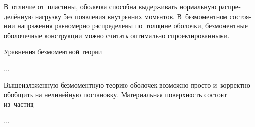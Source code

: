 

\begin{otherlanguage}{russian}

В~отличие от~пластины, оболочка способна выдерживать нормальную распределённую нагрузку без появления внутренних моментов. В~безмоментном состоянии напряжения равномерно распределены по~толщине оболочки, безмоментные оболочечные конструкции можно считать оптимально спроектированными.

Уравнения безмоментной теории

...



\end{otherlanguage}



\begin{otherlanguage}{russian}

Вышеизложенную безмоментную теорию оболочек возможно просто и~корректно обобщить на нелинейную постановку. Материальная поверхность состоит из~частиц

...



\end{otherlanguage}




